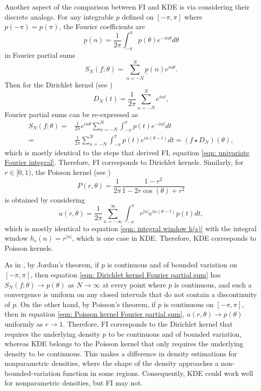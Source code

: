 \documentclass[%
 reprint,
 amsmath,amssymb,
 aps,
]{revtex4-2}
\begin{document}
Another aspect of the comparison between FI and KDE is via considering their discrete analogs. For any integrable $p$ defined on $[-\pi, \pi]$ where $p(-\pi) = p(\pi)$, the Fourier coefficients are
\begin{equation*}
    \underline{p}(n) = \frac{1}{2\pi}\int_{-\pi}^\pi p(\theta) e^{-in\theta}d\theta
\end{equation*}
in Fourier partial sums
\begin{equation*}
    S_N(f; \theta) = \sum_{n = -N}^N \underline{p}(n) e^{in\theta}.
\end{equation*}
Then for the Dirichlet kernel (see \cite{bhatia2005fourier})
\begin{equation*}
    D_N(t) = \frac{1}{2\pi} \sum_{n = -N}^N e^{int},
\end{equation*}
Fourier partial sums can be re-expressed as
\begin{align} \label{eqn: Dirichlet kernel Fourier partial sum}
    S_N(f; \theta) = & \frac{1}{2\pi} e^{in\theta} \sum_{n = -N}^N \int_{-\pi}^\pi p(t) e^{-int}dt\\
    = & \frac{1}{2\pi} \sum_{n = -N}^N \int_{-\pi}^\pi p(t) e^{in(\theta - t)}dt = (f \star D_N)(\theta),
\end{align}
which is mostly identical to the steps that derived FI, equation \eqref{eqn: univariate Fourier integral}. Therefore, FI corresponds to Dirichlet kernels. Similarly, for $r \in [0, 1)$, the Poisson kernel (see \cite{bhatia2005fourier})
\begin{equation*}
    P(r, \theta) = \frac{1}{2\pi} \frac{1-r^2}{1-2r\cos(\theta)+r^2}
\end{equation*}
is obtained by considering
\begin{equation} \label{eqn: Poisson kernel Fourier partial sum}
    u(r, \theta) = \frac{1}{2\pi} \sum_{n = -\infty}^\infty \int_{-\pi}^\pi r^{|n|} e^{in(\theta-t)} p(t)dt,
\end{equation}
which is mostly identical to equation \eqref{eqn: integral window h(s)} with the integral window $h_r(n) = r^{|n|}$, which is one case in KDE. Therefore, KDE corresponds to Poisson kernels.

As in \cite{bhatia2005fourier}, by Jordan's theorem, if $p$ is continuous and of bounded variation on $[-\pi, \pi]$, then equation \eqref{eqn: Dirichlet kernel Fourier partial sum} has $\displaystyle S_N(f; \theta) \to p(\theta)$ as $N \to \infty$ at every point where $p$ is continuous, and such a convergence is uniform on any closed intervals that do not contain a discontinuity of $p$. On the other hand, by Poisson's theorem, if $p$ is continuous on $[-\pi, \pi]$, then in equation \eqref{eqn: Poisson kernel Fourier partial sum}, $u(r, \theta) \to p(\theta)$ uniformly as $r \to 1$. Therefore, FI corresponds to the Dirichlet kernel that requires the underlying density $p$ to be continuous and of bounded variation, whereas KDE belongs to the Poisson kernel that only requires the underlying density to be continuous. This makes a difference in density estimations for nonparametric densities, where the shape of the density approaches a non-bounded-variation function in some regions. Consequently, KDE could work well for nonparametric densities, but FI may not.
\end{document}
